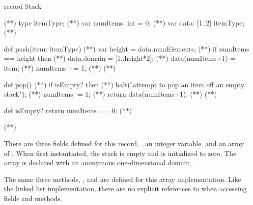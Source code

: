 \begin{numberedchapel}
record Stack {                     (*\label{stack_array_start}*)
  type itemType;                   (*\label{stack_array_itemtype}*)
  var numItems: int = 0;           (*\label{stack_array_numitems}*)
  var data: [1..2] itemType;       (*\label{stack_array_data}*)

  def push(item: itemType) {       (*\label{stack_array_push_start}*)
    var height = data.numElements;  (*\label{stack_array_push_height}*)
    if numItems == height then      (*\label{stack_array_push_check_height}*)
      data.domain = [1..height*2];  (*\label{stack_array_push_incr_dom}*)
    data(numItems+1) = item;        (*\label{stack_array_push_new_item}*)
    numItems += 1;                  (*\label{stack_array_push_num_incr}*)
  }                                 (*\label{stack_array_push_end}*)

  def pop() {                       (*\label{stack_array_pop_start}*)
    if isEmpty? then                (*\label{stack_array_pop_empty_1}*)
      halt("attempt to pop an item off an empty stack"); (*\label{stack_array_pop_empty_2}*)
    numItems -= 1;                  (*\label{stack_array_pop_num_dec}*)
    return data(numItems+1);        (*\label{stack_array_pop_return}*)
  }                                 (*\label{stack_array_pop_end}*)

  def isEmpty? return numItems == 0; (*\label{stack_array_isempty}*)
}                                   (*\label{stack_array_end}*)
\end{numberedchapel}

There are three fields defined for this  record, ,
an integer variable,  and an array  of .
When first instantiated,
the stack is empty and  is initialized to zero.   The 
array is declared with an anonymous one-dimensional domain, \chpl{[1..2]}.

The same three methods, ,  and  are
defined for this array implementation.  Like the linked list implementation,
there are no explicit references to  when accessing fields and
methods.

